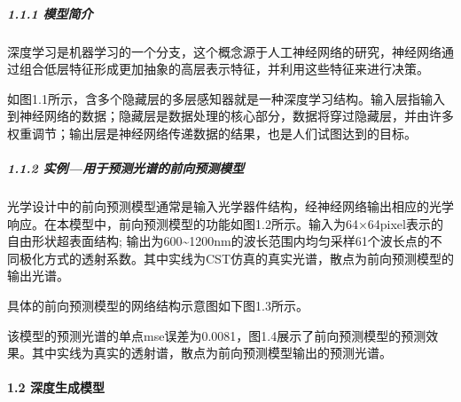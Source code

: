 \documentclass[a4paper,10pt,english]{sphinxmanual}
\begin{document}
\subparagraph{1.1.1 模型简介}
\label{\detokenize{_u7b80_u4ecb/_u6838_u5fc3_u8bbe_u8ba1_u4f18_u5316_u7b97_u6cd5/_u6df1_u5ea6_u5b66_u4e60_u6a21_u5757/_u6df1_u5ea6_u5b66_u4e60_u6a21_u578b:id4}}
\sphinxAtStartPar
深度学习是机器学习的一个分支，这个概念源于人工神经网络的研究，神经网络通过组合低层特征形成更加抽象的高层表示特征，并利用这些特征来进行决策。


\sphinxAtStartPar
{}





\sphinxAtStartPar
如图1.1所示，含多个隐藏层的多层感知器就是一种深度学习结构。输入层指输入到神经网络的数据；隐藏层是数据处理的核心部分，数据将穿过隐藏层，并由许多权重调节；输出层是神经网络传递数据的结果，也是人们试图达到的目标。


\subparagraph{1.1.2 实例—用于预测光谱的前向预测模型}
\label{\detokenize{_u7b80_u4ecb/_u6838_u5fc3_u8bbe_u8ba1_u4f18_u5316_u7b97_u6cd5/_u6df1_u5ea6_u5b66_u4e60_u6a21_u5757/_u6df1_u5ea6_u5b66_u4e60_u6a21_u578b:id5}}
\sphinxAtStartPar


\sphinxAtStartPar
{}





\sphinxAtStartPar
光学设计中的前向预测模型通常是输入光学器件结构，经神经网络输出相应的光学响应。在本模型中，前向预测模型的功能如图1.2所示。输入为64×64pixel表示的自由形状超表面结构; 输出为600\textasciitilde{}1200nm的波长范围内均匀采样61个波长点的不同极化方式的透射系数。其中实线为CST仿真的真实光谱，散点为前向预测模型的输出光谱。

\sphinxAtStartPar
具体的前向预测模型的网络结构示意图如下图1.3所示。


\sphinxAtStartPar
{}





\sphinxAtStartPar
{}





\sphinxAtStartPar
该模型的预测光谱的单点mse误差为0.0081，图1.4展示了前向预测模型的预测效果。其中实线为真实的透射谱，散点为前向预测模型输出的预测光谱。


\paragraph{1.2 深度生成模型}
\label{\detokenize{_u7b80_u4ecb/_u6838_u5fc3_u8bbe_u8ba1_u4f18_u5316_u7b97_u6cd5/_u6df1_u5ea6_u5b66_u4e60_u6a21_u5757/_u6df1_u5ea6_u5b66_u4e60_u6a21_u578b:id6}}
\end{document}
